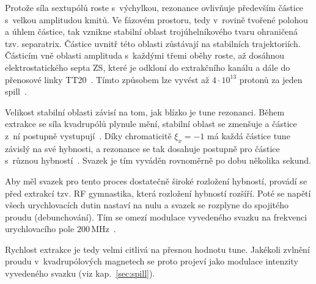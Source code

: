 Protože síla sextupólů roste s~výchylkou, rezonance ovlivňuje především
částice s~velkou amplitudou kmitů. Ve fázovém prostoru, tedy v~rovině tvořené
polohou a úhlem částice, tak vznikne stabilní oblast trojúhelníkového tvaru
ohraničená tzv. separatrix. Částice uvnitř této oblasti zůstávají na stabilních
trajektoriích. Částicím vně oblasti amplituda s~každými třemi oběhy roste, až
dosáhnou elektrostatického septa ZS, které je odkloní do extrakčního kanálu
a dále do přenosové linky TT20~\cite{Velotti}. Tímto způsobem lze vyvést až
$4\cdot10^{13}$ protonů za jeden spill~\cite{Velotti}.


Velikost stabilní oblasti závisí na tom, jak blízko je tune rezonanci. Během
extrakce se síla kvadrupólů plynule mění, stabilní oblast se zmenšuje a částice
z~ní postupně vystupují~\cite{Velotti}. Díky chromaticitě $\xi_x = -1$ má
každá částice tune závislý na své hybnosti, a rezonance se tak dosahuje
postupně pro částice s~různou hybností~\cite{Velotti}. Svazek je tím vyváděn
rovnoměrně po dobu několika sekund.

Aby měl svazek pro tento proces dostatečně široké rozložení hybností,
provádí se před extrakcí tzv. RF gymnastika, která rozložení hybností
rozšíří. Poté se napětí všech urychlovacích dutin nastaví na nulu a svazek
se rozplyne do spojitého proudu (debunchování). Tím se omezí modulace
vyvedeného svazku na frekvenci urychlovacího pole $200\,\text{MHz}$~\cite{Velotti}.

Rychlost extrakce je tedy velmi citlivá na přesnou hodnotu tune. Jakékoli
zvlnění proudu v~kvadrupólových magnetech se proto projeví jako modulace
intenzity vyvedeného svazku (viz kap.~\ref{sec:spill}).

